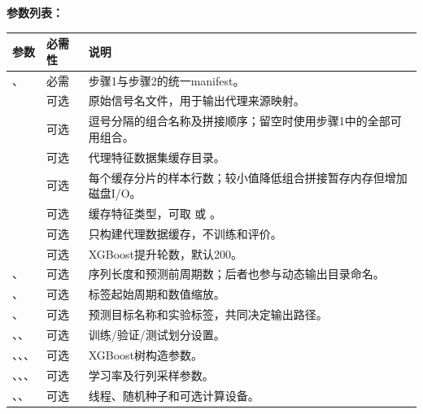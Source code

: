 \textbf{参数列表：}
\begin{longtable}{L{0.31\textwidth}L{0.14\textwidth}L{0.42\textwidth}}
\toprule 参数 & 必需性 & 说明 \\ \midrule
{}、 & 必需 & 步骤1与步骤2的统一manifest。 \\
 & 可选 & 原始信号名文件，用于输出代理来源映射。 \\
 & 可选 & 逗号分隔的组合名称及拼接顺序；留空时使用步骤1中的全部可用组合。 \\
 & 可选 & 代理特征数据集缓存目录。 \\
 & 可选 & 每个缓存分片的样本行数；较小值降低组合拼接暂存内存但增加磁盘I/O。 \\
 & 可选 & 缓存特征类型，可取  或 。 \\
 & 可选 & 只构建代理数据缓存，不训练和评价。 \\
 & 可选 & XGBoost提升轮数，默认200。 \\
、 & 可选 & 序列长度和预测前周期数；后者也参与动态输出目录命名。 \\
、 & 可选 & 标签起始周期和数值缩放。 \\
、 & 可选 & 预测目标名称和实验标签，共同决定输出路径。 \\
、、 & 可选 & 训练/验证/测试划分设置。 \\
、、、 & 可选 & XGBoost树构造参数。 \\
、、、 & 可选 & 学习率及行列采样参数。 \\
、、 & 可选 & 线程、随机种子和可选计算设备。 \\
\bottomrule
\end{longtable}

